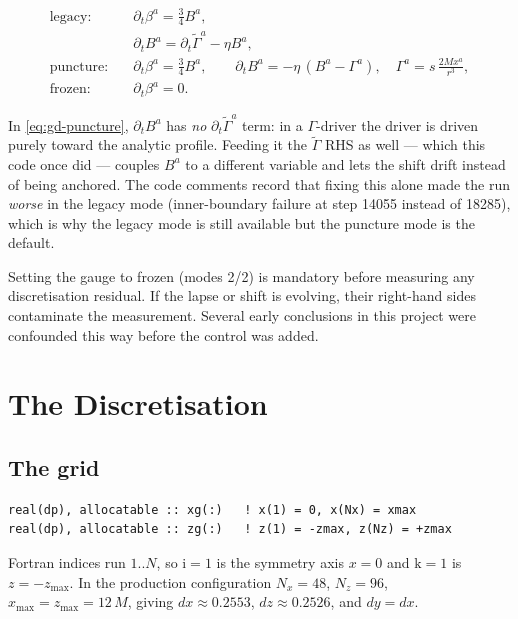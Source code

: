 \begin{align}
\text{legacy:} \quad
&\partial_t\beta^a = \tfrac34 B^a, \label{eq:gd-legacy}\\
&\partial_t B^a = \partial_t\tilde{\Gamma}^a - \eta B^a,
  \label{eq:gd-legacy-d}\\
\text{puncture:} \quad
&\partial_t\beta^a = \tfrac34 B^a,\qquad
  \partial_t B^a = -\eta\,(B^a - \Gamma^a), \quad
  \Gamma^a = s\,\frac{2Mx^a}{r^3}, \label{eq:gd-puncture}\\
\text{frozen:} \quad &\partial_t\beta^a = 0.
  \label{eq:gd-frozen}
\end{align}

\gotcha
In \eqref{eq:gd-puncture}, $\partial_t B^a$ has \emph{no} $\partial_t
\tilde{\Gamma}^a$ term: in a $\Gamma$-driver the driver is driven purely toward
the analytic profile. Feeding it the $\tilde{\Gamma}$ RHS as well --- which this
code once did --- couples $B^a$ to a different variable and lets the shift
drift instead of being anchored. The code comments record that fixing this
alone made the run \emph{worse} in the legacy mode (inner-boundary failure at
step 14055 instead of 18285), which is why the legacy mode is still available
but the puncture mode is the default.

\gotcha
Setting the gauge to frozen (modes 2/2) is mandatory before measuring any
discretisation residual. If the lapse or shift is evolving, their right-hand
sides contaminate the measurement. Several early conclusions in this project
were confounded this way before the control was added.

\section{The Discretisation}
\label{ch:disc}

\subsection{The grid}

\begin{lstlisting}
real(dp), allocatable :: xg(:)   ! x(1) = 0, x(Nx) = xmax
real(dp), allocatable :: zg(:)   ! z(1) = -zmax, z(Nz) = +zmax
\end{lstlisting}

Fortran indices run $1..N$, so $\mathrm{i}=1$ is the symmetry axis $x=0$ and
$\mathrm{k}=1$ is $z=-z_{\max}$. In the production configuration
$N_x = 48$, $N_z = 96$, $x_{\max} = z_{\max} = 12\,M$, giving
$dx \approx 0.2553$, $dz \approx 0.2526$, and $dy = dx$.

